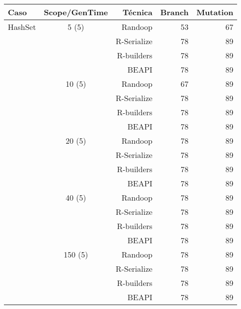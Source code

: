 \begin{table}[H]
\scriptsize
\centering
\label{tab:results-obj1}
\begin{tabular}{ l c  r  |r | r  }
  \toprule
  \textbf{Caso} & \textbf{Scope/GenTime} & \textbf{Técnica} & \textbf{Branch}  & \textbf{Mutation} \\
  \midrule
  HashSet		&	5 (5)	&	Randoop	&	53	&	67\\
&		&	R-Serialize	&	78	&	89 	\\
&		&	R-builders	&	78	&	89 	\\
&		&	BEAPI	&	78	&	89 \\
\cline{2-5}
		&	10 (5)	&	Randoop	&	67	&	89\\
&		&	R-Serialize	&	78	&	89 	\\
&		&	R-builders	&	78	&	89 	\\
&		&	BEAPI	&	78	&	89 \\
\cline{2-5}
		&	20 (5)	&	Randoop	&	78	&	89\\
&		&	R-Serialize	&	78	&	89 	\\
&		&	R-builders	&	78	&	89 	\\
&		&	BEAPI	&	78	&	89 \\
\cline{2-5}
		&	40 (5)	&	Randoop	&	78	&	89\\
&		&	R-Serialize	&	78	&	89 	\\
&		&	R-builders	&	78	&	89 	\\
&		&	BEAPI	&	78	&	89 \\
\cline{2-5}
		&	150 (5)	&	Randoop	&	78	&	89\\
&		&	R-Serialize	&	78	&	89 	\\
&		&	R-builders	&	78	&	89 	\\
&		&	BEAPI	&	78	&	89 \\
\end{tabular}
\end{table}

